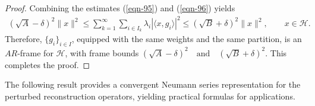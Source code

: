 \documentclass[12pt,titlepage]{amsart}
\theoremstyle{definition}
\theoremstyle{remark}
\begin{document}
\begin{proof}
Combining the estimates (\ref{eqn-95}) and (\ref{eqn-96}) yields
\begin{eqnarray*}
(\sqrt A-\delta)^2\|x\|^2 \le \sum_{k=1}^{\infty}\sum_{i\in I_k}
\lambda_i |\langle x,g_i\rangle|^2 \le (\sqrt B+\delta)^2\|x\|^2,
\qquad x\in\mathcal H.
\end{eqnarray*}
Therefore, $\{g_i\}_{i\in I}$, equipped with the same weights and
the same partition, is an $AR$-frame for $\mathcal H$, with frame
bounds $(\sqrt A-\delta)^2 \quad\text{and}\quad (\sqrt
B+\delta)^2$. This completes the proof.

\end{proof}

The following result provides a convergent Neumann series
representation for the perturbed reconstruction operators,
yielding practical formulas for applications.
\end{document}
